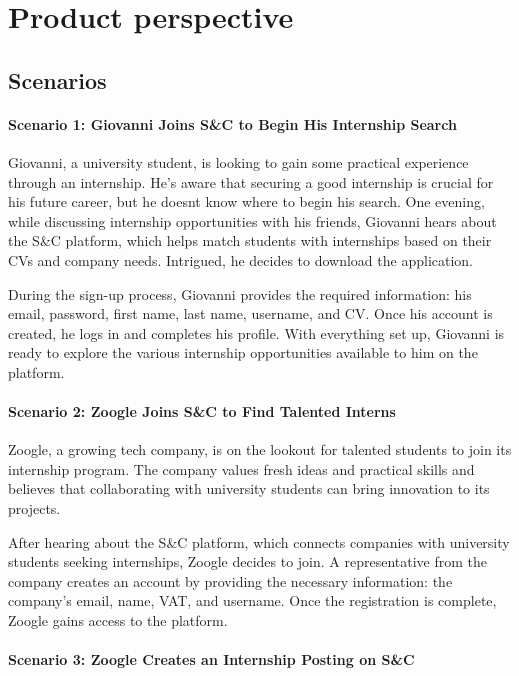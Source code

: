 \section{Product perspective}
\label{sec:product_perspesctive}%

\subsection{Scenarios}
\label{subsec:scenarios}%

\paragraph{Scenario 1: Giovanni Joins S\&C to Begin His Internship
Search}
Giovanni, a university student, is looking to gain some practical
experience through an internship. He's aware that securing a good
internship is crucial for his future career, but he
doesn\textquotesingle t know where to begin his search. One evening,
while discussing internship opportunities with his friends, Giovanni
hears about the S\&C platform, which helps match students with
internships based on their CVs and company needs. Intrigued, he decides
to download the application.

During the sign-up process, Giovanni provides the required information:
his email, password, first name, last name, username, and CV. Once his
account is created, he logs in and completes his profile. With
everything set up, Giovanni is ready to explore the various internship
opportunities available to him on the platform.

\paragraph{Scenario 2: Zoogle Joins S\&C to Find Talented Interns}
Zoogle, a growing tech company, is on the lookout for talented students
to join its internship program. The company values fresh ideas and
practical skills and believes that collaborating with university
students can bring innovation to its projects.

After hearing about the S\&C platform, which connects companies with
university students seeking internships, Zoogle decides to join. A
representative from the company creates an account by providing the
necessary information: the company's email, name, VAT, and username.
Once the registration is complete, Zoogle gains access to the platform.

\paragraph{Scenario 3: Zoogle Creates an Internship Posting on S\&C}

